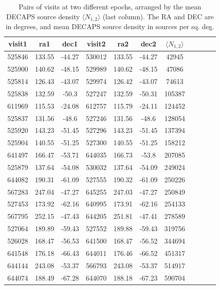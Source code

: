 \documentclass[DM,lsstdraft,toc,usenatbib]{lsstdoc}
\begin{document}
\begin{table}
\centering
\caption{Pairs of visits at two different epochs, arranged by the mean DECAPS source density $\langle N_{1,2} \rangle$ (last column). The RA and DEC are in degrees, and mean DECAPS source density in sources per sq. deg.}
\label{tab:epoch12_selection}
\begin{tabular}{ccccccccccc}
\hline
visit1 & ra1 & dec1 & visit2 & ra2 & dec2 & $\langle N_{1,2} \rangle$ \\
\hline
525846 & 133.55 & -44.27 & 530012 & 133.55 & -44.27 & 42945 \\
525900 & 140.62 & -48.15 & 529989 & 140.62 & -48.15 & 47086 \\
525814 & 126.43 & -43.07 & 529974 & 126.42 & -43.07 & 74613 \\
525838 & 132.59 & -50.3 & 527247 & 132.59 & -50.31 & 105387 \\
611969 & 115.53 & -24.08 & 612757 & 115.79 & -24.11 & 124452 \\
525837 & 131.56 & -48.6 & 527246 & 131.56 & -48.6 & 128054 \\
525920 & 143.23 & -51.45 & 527296 & 143.23 & -51.45 & 137394 \\
525904 & 140.55 & -51.25 & 527300 & 140.55 & -51.25 & 158212 \\
641497 & 166.47 & -53.71 & 644035 & 166.73 & -53.8 & 207085 \\
525879 & 137.64 & -54.08 & 530032 & 137.64 & -54.09 & 249024 \\
644082 & 190.31 & -61.09 & 527555 & 190.32 & -61.09 & 250226 \\
567283 & 247.04 & -47.27 & 645255 & 247.03 & -47.27 & 250849 \\
527453 & 173.92 & -62.16 & 640995 & 173.91 & -62.16 & 254133 \\
567795 & 252.15 & -47.43 & 644205 & 251.81 & -47.41 & 278589 \\
527064 & 189.89 & -59.43 & 527552 & 189.88 & -59.43 & 319756 \\
526028 & 168.47 & -56.53 & 641500 & 168.47 & -56.52 & 344694 \\
641548 & 176.18 & -66.43 & 644011 & 176.46 & -66.52 & 451317 \\
644144 & 243.08 & -53.37 & 566793 & 243.08 & -53.37 & 514917 \\
644074 & 188.49 & -67.28 & 644070 & 188.18 & -67.23 & 590704 \\
\hline
\end{tabular}
\end{table}
\end{document}
